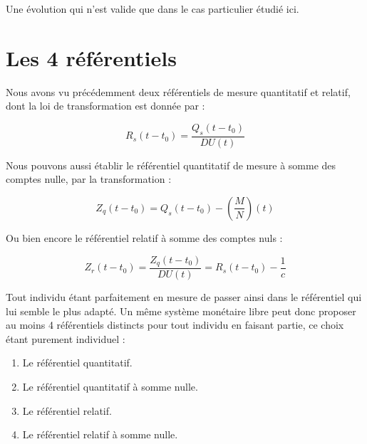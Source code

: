 \documentclass[a4paper,oneside,12pt]{article}
\begin{document}

Une évolution qui n'est valide que dans le cas particulier étudié ici.

\section{Les 4 référentiels}

Nous avons vu précédemment deux référentiels de mesure quantitatif et relatif, dont la loi de transformation est donnée par :

\begin{displaymath}R_s(t-t_{0})=\frac{Q_s(t-t_{0})}{DU(t)} \end{displaymath}

Nous pouvons aussi établir le référentiel quantitatif de mesure à somme des comptes nulle, par la transformation :

\begin{displaymath}Z_q(t-t_{0})=Q_s(t-t_{0})-\left( \frac{M}{N} \right) (t) \end{displaymath}

Ou bien encore le référentiel relatif à somme des comptes nuls :

\begin{displaymath}Z_r(t-t_{0})=\frac{Z_q(t-t_{0})}{DU(t)}=R_s(t-t_{0}) - \frac{1}{c} \end{displaymath}

Tout individu étant parfaitement en mesure de passer ainsi dans le référentiel qui lui semble le plus adapté. Un même système monétaire libre peut donc proposer au moins 4 référentiels distincts pour tout individu en faisant partie, ce choix étant purement individuel :

\begin{enumerate}
\item Le référentiel quantitatif.
\item Le référentiel quantitatif à somme nulle.
\item Le référentiel relatif.
\item Le référentiel relatif à somme nulle.
\end{enumerate}
\end{document}

